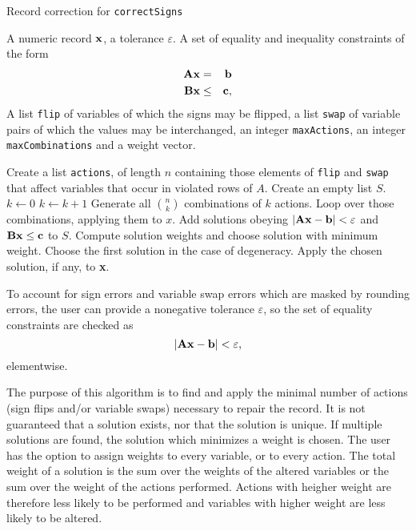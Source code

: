 \documentclass[11pt, fleqn, a4paper]{article}
\begin{document}
\begin{algorithm}[t]
\caption{Record correction for {\tt correctSigns}}
\label{correctSigns}
\begin{algorithmic}[1]
\Require A numeric record $\bf x$, a tolerance $\varepsilon$. A set of equality and
    inequality constraints of the form
\begin{eqnarray*}
{\bf Ax} &=& {\bf b}\\
{\bf Bx} &\leq& {\bf c},
\end{eqnarray*}
A list {\tt flip} of variables of which the signs may be flipped, a list {\tt swap} of
variable pairs of which the values may be interchanged, an integer {\tt maxActions}, an
integer {\tt maxCombinations} and a weight vector.

\State Create a list {\tt actions}, of length $n$ containing those elements of {\tt flip} and {\tt swap} that
    affect variables that occur in violated rows of $A$.
\State Create an empty list $S$.
\State $k\leftarrow 0$
   \State $k\leftarrow k+1$ 
   \State Generate all ${n\choose k}$ combinations of $k$ actions.
   \State Loop over those combinations, applying them to $x$. Add solutions
obeying $|{\bf Ax-b}|<\varepsilon$ and ${\bf Bx}\leq{\bf c}$ to $S$.
  \EndIf
\EndWhile
{}
\State Compute solution weights and choose solution with minimum weight. Choose
the first solution in the case of degeneracy.
\EndIf
\State Apply the chosen solution, if any, to {\bf x}.
\end{algorithmic}
\end{algorithm}

To account for sign errors and variable swap errors which are masked by
rounding errors, the user can provide a nonegative tolerance $\varepsilon$, so
the set of equality constraints are checked as
\begin{equation}
|{\bf Ax -b}| < \varepsilon,
\end{equation}
elementwise.

The purpose of this algorithm is to find and apply the minimal number of
actions (sign flips and/or variable swaps) necessary to repair the record. It
is not guaranteed that a solution exists, nor that the solution is unique. If
multiple solutions are found, the solution which minimizes a weight is chosen.
The user has the option to assign weights to every variable, or to every
action.  The total weight of a solution is the sum over the weights of the
altered variables or the sum over the weight of the actions performed. Actions
with heigher weight are therefore less likely to be performed and variables
with higher weight are less likely to be altered.
\end{document}
